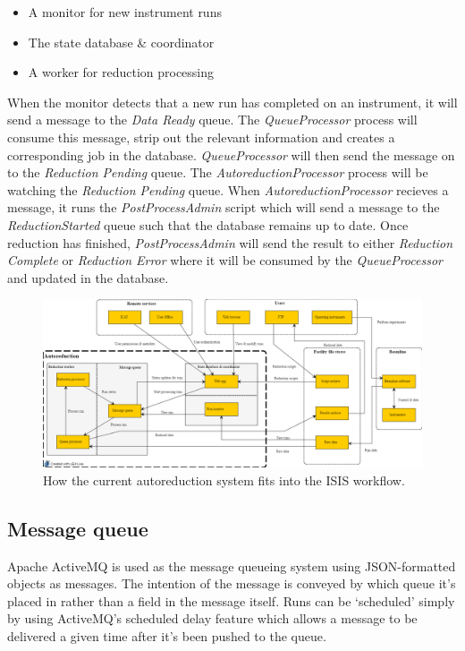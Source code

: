 \documentclass[twocolumn]{article}
\begin{document}
\begin{itemize}[noitemsep]
\item
  A monitor for new instrument runs
\item
  The state database \& coordinator
\item
  A worker for reduction processing
\end{itemize}

When the monitor detects that a new run has completed on an instrument, it will send a 
message to the \emph{Data Ready} queue. The \emph{QueueProcessor} process will consume this
message, strip out the relevant information and creates a corresponding job in the database.
\emph{QueueProcessor} will then send the message on to the \emph{Reduction Pending} queue.
The \emph{AutoreductionProcessor} process will be watching the \emph{Reduction Pending} queue.
When \emph{AutoreductionProcessor} recieves a message, it runs the \emph{PostProcessAdmin} 
script which will send a message to the \emph{ReductionStarted} queue such that the database
remains up to date. Once reduction has finished, \emph{PostProcessAdmin}  will send the
result to either \emph{Reduction Complete} or \emph{Reduction Error} where it will be consumed
by the \emph{QueueProcessor} and updated in the database.


\begin{figure}
\centering\includegraphics[width=1.15\linewidth,angle=90,origin=c]{system.png}
\caption{How the current autoreduction system fits into the ISIS workflow.}
\end{figure}

\subsection{Message queue}\label{message-queue}

Apache ActiveMQ \cite{activemq} is used as the message queueing system using 
JSON-formatted objects as messages. The intention of the message
is conveyed by which queue it's placed in rather than a field in the
message itself. Runs can be `scheduled' simply by using ActiveMQ's
scheduled delay feature which allows a message to be delivered a given
time after it's been pushed to the queue.
\end{document}
